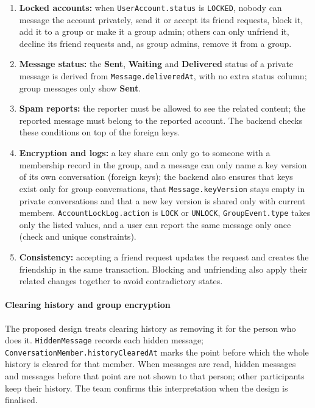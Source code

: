 \begin{enumerate}
  \item \textbf{Locked accounts:} when \texttt{UserAccount.status} is \texttt{LOCKED},
    nobody can message the account privately, send it or accept its friend requests,
    block it, add it to a group or make it a group admin; others can only unfriend it,
    decline its friend requests and, as group admins, remove it from a group.
  \item \textbf{Message status:} the \textbf{Sent}, \textbf{Waiting} and
    \textbf{Delivered} status of a private message is derived from
    \texttt{Message.deliveredAt}, with no extra status column; group messages only
    show \textbf{Sent}.
  \item \textbf{Spam reports:} the reporter must be allowed to see the related
    content; the reported message must belong to the reported account.
    The backend checks these conditions on top of the foreign keys.
  \item \textbf{Encryption and logs:} a key share can only go to someone with a
    membership record in the group, and a message can only name a key version of
    its own conversation (foreign keys); the backend also ensures that keys exist
    only for group conversations, that \texttt{Message.keyVersion} stays empty in
    private conversations and that a new key version is shared only with current
    members. \texttt{AccountLockLog.action} is \texttt{LOCK} or \texttt{UNLOCK},
    \texttt{GroupEvent.type} takes only the listed values, and a user can report
    the same message only once (check and unique constraints).
  \item \textbf{Consistency:} accepting a friend request updates the request and
    creates the friendship in the same transaction. Blocking and unfriending also
    apply their related changes together to avoid contradictory states.
\end{enumerate}

\paragraph{Clearing history and group encryption}
\mbox{}\par

The proposed design treats clearing history as removing it for the person who does
it. \texttt{HiddenMessage} records each hidden message;
\texttt{ConversationMember.historyClearedAt} marks the point before which the whole
history is cleared for that member. When messages are read, hidden messages and
messages before that point are not shown to that person; other participants keep
their history. The team confirms this interpretation when the design is finalised.

